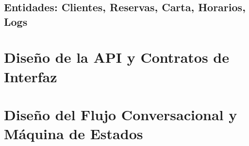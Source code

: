 
\subsection{Entidades: Clientes, Reservas, Carta, Horarios, Logs}
\label{subsec:entidades_modelo}

\textoBaseAlt

\section{Diseño de la API y Contratos de Interfaz}
\label{sec:api_contratos}

\textoBase

\section{Diseño del Flujo Conversacional y Máquina de Estados}
\label{sec:flujo_conversacional}

\textoBaseAlt


